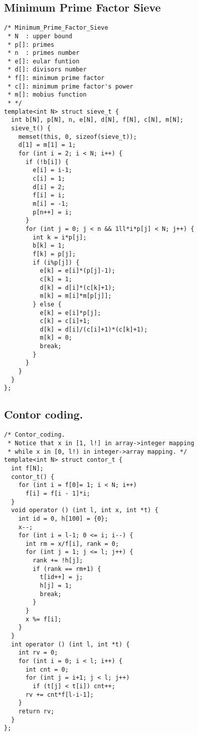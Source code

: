\subsection{Minimum Prime Factor Sieve}
\begin{lstlisting}
/* Minimum_Prime_Factor_Sieve
 * N  : upper bound
 * p[]: primes
 * n  : primes number
 * e[]: eular funtion
 * d[]: divisors number
 * f[]: minimum prime factor
 * c[]: minimum prime factor's power
 * m[]: mobius function
 * */
template<int N> struct sieve_t {
  int b[N], p[N], n, e[N], d[N], f[N], c[N], m[N];
  sieve_t() {
    memset(this, 0, sizeof(sieve_t));
    d[1] = m[1] = 1;
    for (int i = 2; i < N; i++) {
      if (!b[i]) {
        e[i] = i-1;
        c[i] = 1;
        d[i] = 2;
        f[i] = i;
        m[i] = -1;
        p[n++] = i;
      }
      for (int j = 0; j < n && 1ll*i*p[j] < N; j++) {
        int k = i*p[j];
        b[k] = 1;
        f[k] = p[j];
        if (i%p[j]) {
          e[k] = e[i]*(p[j]-1);
          c[k] = 1;
          d[k] = d[i]*(c[k]+1);
          m[k] = m[i]*m[p[j]];
        } else {
          e[k] = e[i]*p[j];
          c[k] = c[i]+1;
          d[k] = d[i]/(c[i]+1)*(c[k]+1);
          m[k] = 0;
          break;
        }
      }
    }
  }
};
\end{lstlisting}


\subsection{Contor coding.}
\begin{lstlisting}
/* Contor_coding.
 * Notice that x in [1, l!] in array->integer mapping
 * while x in [0, l!) in integer->array mapping. */
template<int N> struct contor_t {
  int f[N];
  contor_t() {
    for (int i = f[0]= 1; i < N; i++)
      f[i] = f[i - 1]*i;
  }
  void operator () (int l, int x, int *t) {
    int id = 0, h[100] = {0};
    x--;
    for (int i = l-1; 0 <= i; i--) {
      int rm = x/f[i], rank = 0;
      for (int j = 1; j <= l; j++) {
        rank += !h[j];
        if (rank == rm+1) {
          t[id++] = j;
          h[j] = 1;
          break;
        }
      }
      x %= f[i];
    }
  }
  int operator () (int l, int *t) {
    int rv = 0;
    for (int i = 0; i < l; i++) {
      int cnt = 0;
      for (int j = i+1; j < l; j++)
        if (t[j] < t[i]) cnt++;
      rv += cnt*f[l-i-1];
    }
    return rv;
  }
};
\end{lstlisting}



